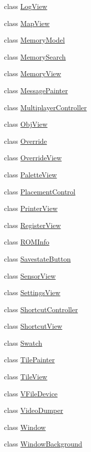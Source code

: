 \begin{DoxyCompactItemize}
class \mbox{\hyperlink{class_q_g_b_a_1_1_log_view}{Log\+View}}
\item 
class \mbox{\hyperlink{class_q_g_b_a_1_1_map_view}{Map\+View}}
\item 
class \mbox{\hyperlink{class_q_g_b_a_1_1_memory_model}{Memory\+Model}}
\item 
class \mbox{\hyperlink{class_q_g_b_a_1_1_memory_search}{Memory\+Search}}
\item 
class \mbox{\hyperlink{class_q_g_b_a_1_1_memory_view}{Memory\+View}}
\item 
class \mbox{\hyperlink{class_q_g_b_a_1_1_message_painter}{Message\+Painter}}
\item 
class \mbox{\hyperlink{class_q_g_b_a_1_1_multiplayer_controller}{Multiplayer\+Controller}}
\item 
class \mbox{\hyperlink{class_q_g_b_a_1_1_obj_view}{Obj\+View}}
\item 
class \mbox{\hyperlink{class_q_g_b_a_1_1_override}{Override}}
\item 
class \mbox{\hyperlink{class_q_g_b_a_1_1_override_view}{Override\+View}}
\item 
class \mbox{\hyperlink{class_q_g_b_a_1_1_palette_view}{Palette\+View}}
\item 
class \mbox{\hyperlink{class_q_g_b_a_1_1_placement_control}{Placement\+Control}}
\item 
class \mbox{\hyperlink{class_q_g_b_a_1_1_printer_view}{Printer\+View}}
\item 
class \mbox{\hyperlink{class_q_g_b_a_1_1_register_view}{Register\+View}}
\item 
class \mbox{\hyperlink{class_q_g_b_a_1_1_r_o_m_info}{R\+O\+M\+Info}}
\item 
class \mbox{\hyperlink{class_q_g_b_a_1_1_savestate_button}{Savestate\+Button}}
\item 
class \mbox{\hyperlink{class_q_g_b_a_1_1_sensor_view}{Sensor\+View}}
\item 
class \mbox{\hyperlink{class_q_g_b_a_1_1_settings_view}{Settings\+View}}
\item 
class \mbox{\hyperlink{class_q_g_b_a_1_1_shortcut_controller}{Shortcut\+Controller}}
\item 
class \mbox{\hyperlink{class_q_g_b_a_1_1_shortcut_view}{Shortcut\+View}}
\item 
class \mbox{\hyperlink{class_q_g_b_a_1_1_swatch}{Swatch}}
\item 
class \mbox{\hyperlink{class_q_g_b_a_1_1_tile_painter}{Tile\+Painter}}
\item 
class \mbox{\hyperlink{class_q_g_b_a_1_1_tile_view}{Tile\+View}}
\item 
class \mbox{\hyperlink{class_q_g_b_a_1_1_v_file_device}{V\+File\+Device}}
\item 
class \mbox{\hyperlink{class_q_g_b_a_1_1_video_dumper}{Video\+Dumper}}
\item 
class \mbox{\hyperlink{class_q_g_b_a_1_1_window}{Window}}
\item 
class \mbox{\hyperlink{class_q_g_b_a_1_1_window_background}{Window\+Background}}
\end{DoxyCompactItemize}
